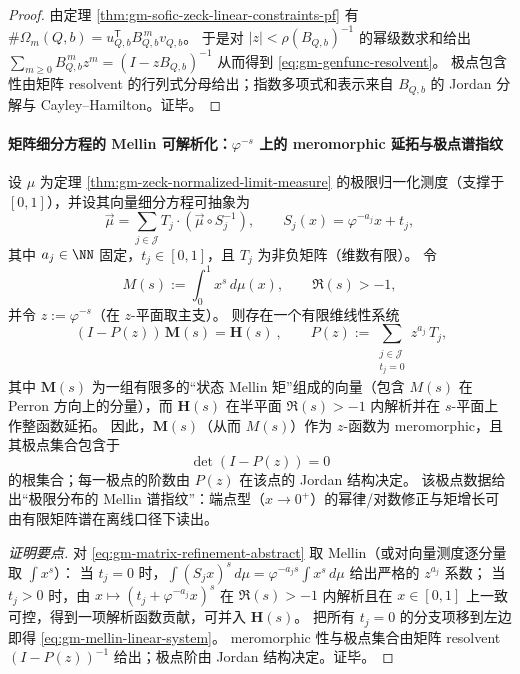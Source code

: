 \begin{proof}
由定理 \ref{thm:gm-sofic-zeck-linear-constraints-pf} 有 \(\#\Omega_m(Q,b)=u_{Q,b}^{\mathsf T}B_{Q,b}^{\,m}v_{Q,b}\)。
于是对 \(|z|<\rho(B_{Q,b})^{-1}\) 的幂级数求和给出
\(
\sum_{m\ge 0}B_{Q,b}^{\,m}z^m=(I-zB_{Q,b})^{-1}
\)
从而得到 \eqref{eq:gm-genfunc-resolvent}。
极点包含性由矩阵 resolvent 的行列式分母给出；指数多项式和表示来自 \(B_{Q,b}\) 的 Jordan 分解与 Cayley--Hamilton。证毕。
\end{proof}

\paragraph{矩阵细分方程的 Mellin 可解析化：\texorpdfstring{$\varphi^{-s}$}{phi^{-s}} 上的 meromorphic 延拓与极点谱指纹}
\begin{theorem}\label{thm:gm-mellin-meromorphic-fingerprint}
设 \(\mu\) 为定理 \ref{thm:gm-zeck-normalized-limit-measure} 的极限归一化测度（支撑于 \([0,1]\)），并设其向量细分方程可抽象为
\begin{equation}\label{eq:gm-matrix-refinement-abstract}
\vec\mu=\sum_{j\in\mathcal{J}}T_j\cdot(\vec\mu\circ S_j^{-1}),
\qquad
S_j(x)=\varphi^{-a_j}x+t_j,
\end{equation}
其中 \(a_j\in\NN\) 固定，\(t_j\in[0,1]\)，且 \(T_j\) 为非负矩阵（维数有限）。
令
\[
M(s):=\int_0^1 x^{s}\,d\mu(x),\qquad \Re(s)>-1,
\]
并令 \(z:=\varphi^{-s}\)（在 \(z\)-平面取主支）。
则存在一个有限维线性系统
\begin{equation}\label{eq:gm-mellin-linear-system}
\boxed{\ (I-P(z))\,\mathbf{M}(s)=\mathbf{H}(s)\ },
\qquad
P(z):=\sum_{\substack{j\in\mathcal{J}\\ t_j=0}} z^{a_j}\,T_j,
\end{equation}
其中 \(\mathbf{M}(s)\) 为一组有限多的“状态 Mellin 矩”组成的向量（包含 \(M(s)\) 在 Perron 方向上的分量），而 \(\mathbf{H}(s)\) 在半平面 \(\Re(s)>-1\) 内解析并在 \(s\)-平面上作整函数延拓。
因此，\(\mathbf{M}(s)\)（从而 \(M(s)\)）作为 \(z\)-函数为 meromorphic，且其极点集合包含于
\[
\det(I-P(z))=0
\]
的根集合；每一极点的阶数由 \(P(z)\) 在该点的 Jordan 结构决定。
该极点数据给出“极限分布的 Mellin 谱指纹”：端点型（\(x\to 0^+\)）的幂律/对数修正与矩增长可由有限矩阵谱在离线口径下读出。
\end{theorem}

\begin{proof}[证明要点]
对 \eqref{eq:gm-matrix-refinement-abstract} 取 Mellin（或对向量测度逐分量取 \(\int x^s\)）：
当 \(t_j=0\) 时，\(\int (S_j x)^s\,d\mu=\varphi^{-a_js}\int x^s\,d\mu\) 给出严格的 \(z^{a_j}\) 系数；
当 \(t_j>0\) 时，由 \(x\mapsto (t_j+\varphi^{-a_j}x)^s\) 在 \(\Re(s)>-1\) 内解析且在 \(x\in[0,1]\) 上一致可控，得到一项解析函数贡献，可并入 \(\mathbf{H}(s)\)。
把所有 \(t_j=0\) 的分支项移到左边即得 \eqref{eq:gm-mellin-linear-system}。
meromorphic 性与极点集合由矩阵 resolvent \((I-P(z))^{-1}\) 给出；极点阶由 Jordan 结构决定。证毕。
\end{proof}

